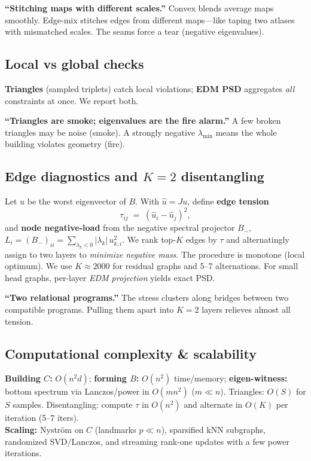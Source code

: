 \documentclass[11pt]{article}
\newcommand{\1}{\mathbf{1}}
\begin{document}
\begin{tcolorbox}[colback=blue!3,colframe=blue!40!black,title=Intuition (for \S\ref{sec:mix})]
\textbf{``Stitching maps with different scales.''} Convex blends average maps smoothly. Edge-mix stitches edges from different maps---like taping two atlases with mismatched scales. The seams force a tear (negative eigenvalues).
\end{tcolorbox}

\subsection{Local vs global checks}\label{sec:localglobal}
\textbf{Triangles} (sampled triplets) catch local violations; \textbf{EDM PSD} aggregates \emph{all} constraints at once. We report both.

\begin{tcolorbox}[colback=blue!3,colframe=blue!40!black,title=Intuition (for \S\ref{sec:localglobal})]
\textbf{``Triangles are smoke; eigenvalues are the fire alarm.''} A few broken triangles may be noise (smoke). A strongly negative $\lambda_{\min}$ means the whole building violates geometry (fire).
\end{tcolorbox}

\subsection{Edge diagnostics and $K{=}2$ disentangling}\label{sec:k2}
Let $u$ be the worst eigenvector of $B$. With $\hat u=Ju$, define \textbf{edge tension}
\[
\tau_{ij} \;=\; (\hat u_i-\hat u_j)^2,
\]
and \textbf{node negative-load} from the negative spectral projector $B_-$, $L_i=(B_-)_{ii}=\sum_{\lambda_k<0}|\lambda_k|\,u_{k,i}^2$.
We rank top-$K$ edges by $\tau$ and alternatingly assign to two layers to \emph{minimize negative mass}. The procedure is monotone (local optimum). We use $K\!\approx\!2000$ for residual graphs and 5--7 alternations. For small head graphs, per-layer \emph{EDM projection} yields exact PSD.

\begin{tcolorbox}[colback=blue!3,colframe=blue!40!black,title=Intuition (for \S\ref{sec:k2})]
\textbf{``Two relational programs.''} The stress clusters along bridges between two compatible programs. Pulling them apart into $K{=}2$ layers relieves almost all tension.
\end{tcolorbox}

\subsection{Computational complexity \& scalability}
\textbf{Building $C$:} $O(n^2d)$; \textbf{forming $B$:} $O(n^2)$ time/memory; \textbf{eigen-witness:} bottom spectrum via Lanczos/power in $O(mn^2)$ ($m\!\ll\!n$). Triangles: $O(S)$ for $S$ samples. Disentangling: compute $\tau$ in $O(n^2)$ and alternate in $O(K)$ per iteration (5--7 iters).\\
\textbf{Scaling:} Nyström on $C$ (landmarks $p\!\ll\!n$), sparsified kNN subgraphs, randomized SVD/Lanczos, and streaming rank-one updates with a few power iterations.
\end{document}
